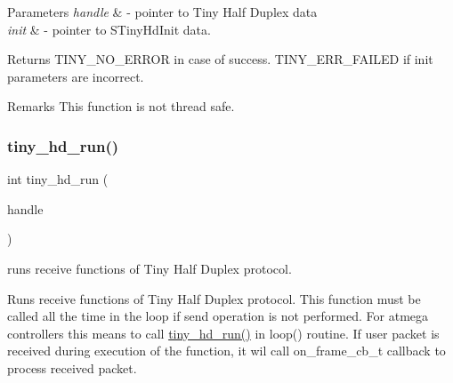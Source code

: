 \begin{DoxyParams}{Parameters}
{\em handle} & -\/ pointer to Tiny Half Duplex data \\
\hline
{\em init} & -\/ pointer to S\+Tiny\+Hd\+Init data. \\
\hline
\end{DoxyParams}
\begin{DoxyReturn}{Returns}
T\+I\+N\+Y\+\_\+\+N\+O\+\_\+\+E\+R\+R\+OR in case of success. T\+I\+N\+Y\+\_\+\+E\+R\+R\+\_\+\+F\+A\+I\+L\+ED if init parameters are incorrect. 
\end{DoxyReturn}
\begin{DoxyRemark}{Remarks}
This function is not thread safe. 
\end{DoxyRemark}
\mbox{\label{group__HALF__DUPLEX__API_gac962595f09883dea1dd0992a608a17b9}} 
\subsubsection{\texorpdfstring{tiny\+\_\+hd\+\_\+run()}{tiny\_hd\_run()}}
{\footnotesize\ttfamily int tiny\+\_\+hd\+\_\+run (\begin{DoxyParamCaption}\item[{\hyperlink{group__HALF__DUPLEX__API_gaf9f81ad129b754a780dfca5dcd7f7cf9}{S\+Tiny\+Hd\+Data} $\ast$}]{handle }\end{DoxyParamCaption})}



runs receive functions of Tiny Half Duplex protocol. 

Runs receive functions of Tiny Half Duplex protocol. This function must be called all the time in the loop if send operation is not performed. For atmega controllers this means to call \hyperlink{group__HALF__DUPLEX__API_gac962595f09883dea1dd0992a608a17b9}{tiny\+\_\+hd\+\_\+run()} in loop() routine. If user packet is received during execution of the function, it wil call on\+\_\+frame\+\_\+cb\+\_\+t callback to process received packet.


